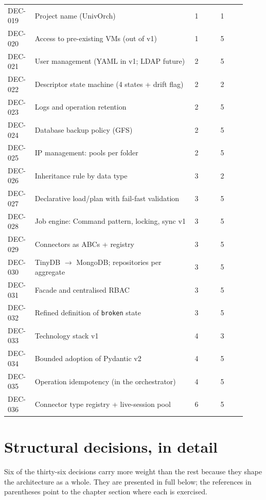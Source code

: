 \begin{longtable}{p{0.10\linewidth} p{0.62\linewidth} p{0.10\linewidth} p{0.10\linewidth}}
  DEC-019  & Project name (UnivOrch)                              & 1 & 1 \\
  DEC-020  & Access to pre-existing VMs (out of v1)               & 1 & 5 \\
  DEC-021  & User management (YAML in v1; LDAP future)            & 2 & 5 \\
  DEC-022  & Descriptor state machine (4 states + drift flag)     & 2 & 2 \\
  DEC-023  & Logs and operation retention                         & 2 & 5 \\
  DEC-024  & Database backup policy (GFS)                         & 2 & 5 \\
  DEC-025  & IP management: pools per folder                      & 2 & 5 \\
  DEC-026  & Inheritance rule by data type                        & 3 & 2 \\
  DEC-027  & Declarative load/plan with fail-fast validation      & 3 & 5 \\
  DEC-028  & Job engine: Command pattern, locking, sync v1        & 3 & 5 \\
  DEC-029  & Connectors as ABCs + registry                        & 3 & 5 \\
  DEC-030  & TinyDB $\rightarrow$ MongoDB; repositories per aggregate & 3 & 5 \\
  DEC-031  & Facade and centralised RBAC                          & 3 & 5 \\
  DEC-032  & Refined definition of \texttt{broken} state          & 3 & 5 \\
  DEC-033  & Technology stack v1                                  & 4 & 3 \\
  DEC-034  & Bounded adoption of Pydantic v2                      & 4 & 5 \\
  DEC-035  & Operation idempotency (in the orchestrator)          & 4 & 5 \\
  DEC-036  & Connector type registry + live-session pool          & 6 & 5 \\
  \bottomrule
\end{longtable}

\section{Structural decisions, in detail}

Six of the thirty-six decisions carry more weight than the rest
because they shape the architecture as a whole. They are presented
in full below; the references in parentheses point to the chapter
section where each is exercised.

